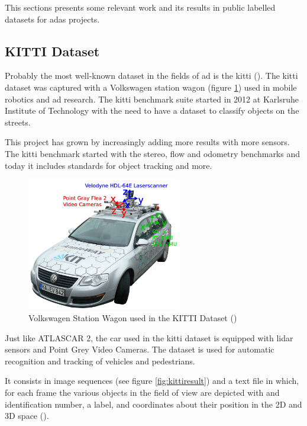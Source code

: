 This sections presents some relevant work and its results in public labelled datasets for \gls{adas} projects.

\subsection{KITTI Dataset}
Probably the most well-known dataset in the fields of \gls{ad} is the \gls{kitti} (\cite{KarlsruheInstituteofTechnology}). The \gls{kitti} dataset was captured with a Volkswagen station wagon (figure \ref{fig:kitticar}) used in mobile robotics and \gls{ad} research. The \gls{kitti} benchmark suite started in 2012 at Karlsruhe Institute of Technology with the need to have a dataset to classify objects on the streets. 

This project has grown by increasingly adding more results with more sensors. The \gls{kitti} benchmark started with the stereo, flow and odometry benchmarks and today it includes standards for object tracking and more. 

\begin{figure}
	
	\centering
	\includegraphics[width=0.6\textwidth]{capstate/imgs/kitticar}
	
	\caption{Volkswagen Station Wagon used in the KITTI Dataset (\cite{KarlsruheInstituteofTechnology})}
	\label{fig:kitticar}
	
\end{figure}

Just like ATLASCAR 2, the car used in the \gls{kitti} dataset is equipped with \gls{lidar} sensors and Point Grey Video Cameras. The dataset is used for automatic recognition and tracking of vehicles and pedestrians. 

It consists in image sequences (see figure \ref{fig:kittiresult}) and a text file in which, for each frame the various objects in the field of view are depicted with and identification number, a label, and coordinates about their position in the 2D and 3D space (\cite{Geiger}). 

